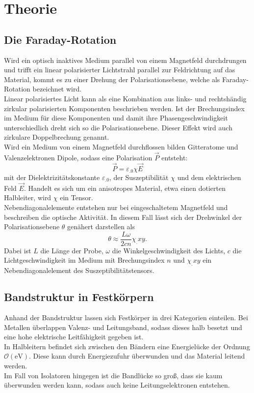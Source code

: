 \section{Theorie}
\label{sec:Theorie}

\subsection{Die Faraday-Rotation}

Wird ein optisch inaktives Medium parallel von einem Magnetfeld durchdrungen und trifft ein linear polarisierter Lichtstrahl parallel zur Feldrichtung auf das Material, kommt es zu einer Drehung der Polarisationsebene, welche als Faraday-Rotation bezeichnet wird.\\
Linear polarisiertes Licht kann als eine Kombination aus links- und rechtshändig zirkular polarisierten Komponenten beschrieben werden. Ist der Brechungsindex im Medium für diese Komponenten und damit ihre Phasengeschwindigkeit unterschiedlich dreht sich so die Polarisationsebene. Dieser Effekt wird auch zirkulare Doppelbrechung genannt.\\
Wird ein Medium von einem Magnetfeld durchflossen bilden Gitteratome und Valenzelektronen Dipole, sodass eine Polarisation $\vec{P}$ entsteht:
\[
\vec{P} = \varepsilon_.0 \chi \vec{E}
\]
mit der Dielektrizitätskonstante $\varepsilon_.0$, der Suszeptibilität $\chi$ und dem elektrischen Feld $\vec{E}$. Handelt es sich um ein anisotropes Material, etwa einen dotierten Halbleiter, wird $\chi$ ein Tensor.\\
Nebendiagonalelemente entstehen nur bei eingeschaltetem Magnetfeld und beschreiben die optische Aktivität. In diesem Fall lässt sich der Drehwinkel der Polarisationsebene $\theta$ genähert darstellen als
\begin{equation}
\theta \approx \frac{L \omega}{2 c n}\chi_.{xy}\text{.}\label{eq:theta1}
\end{equation}
Dabei ist $L$ die Länge der Probe, $\omega$ die Winkelgeschwindigkeit des Lichts, $c$
die Lichtgeschwindigkeit im Medium mit Brechungsindex $n$ und $\chi_.{xy}$ ein Nebendiagonalelement des Suszeptibilitätstensors.

\subsection{Bandstruktur in Festkörpern}
Anhand der Bandstruktur lassen sich Festkörper in drei Kategorien einteilen.
Bei Metallen überlappen Valenz- und Leitungsband, sodass dieses halb besetzt und eine hohe elektrische Leitfähigkeit gegeben ist.\\
In Halbleitern befindet sich zwischen den Bändern eine Energielücke der Ordnung $\mathcal{O}(\si{\eV})$. Diese kann durch Energiezufuhr überwunden und das Material leitend werden.\\
Im Fall von Isolatoren hingegen ist die Bandlücke so groß, dass sie kaum überwunden werden kann, sodass auch keine Leitungselektronen entstehen.


